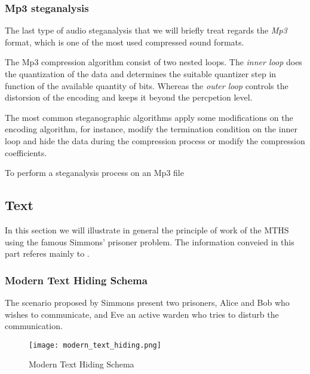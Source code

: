 \documentclass[../../main.tex]{subfiles}
\begin{document}
    \subsubsection{Mp3 steganalysis}
    The last type of audio steganalysis that we will briefly treat regards the
    \emph{Mp3} format, which is one of the most used compressed sound formats.
    
    The Mp3 compression algorithm consist of two nested loops.
    The \emph{inner loop} does the quantization of the data and determines the
    suitable quantizer step in function of the available quantity of bits.
    Whereas the \emph{outer loop} controls the distorsion of the encoding and
    keeps it beyond the percpetion level.

    The most common steganographic algorithms apply some modifications on the
    encoding algorithm, for instance, modify the termination condition on the
    inner loop and hide the data during the compression process or modify the
    compression coefficients.

    To perform a steganalysis process on an Mp3 file

    

    \subsection{Text}
    In this section we will illustrate in general the principle of work of the
    MTHS using the famous Simmons' prisoner problem.
    The information conveied in this part referes mainly to
    \cite{modern-text-hiding}.
    \subsubsection{Modern Text Hiding Schema}
    The scenario proposed by Simmons present two prisoners, Alice and Bob who
    wishes to communicate, and Eve an active warden who tries to disturb the
    communication.
    
    \begin{figure}[h]
        \centering
        \caption{Modern Text Hiding Schema}
        \texttt{[image: modern\_text\_hiding.png]}
    \end{figure}
    
\end{document}
